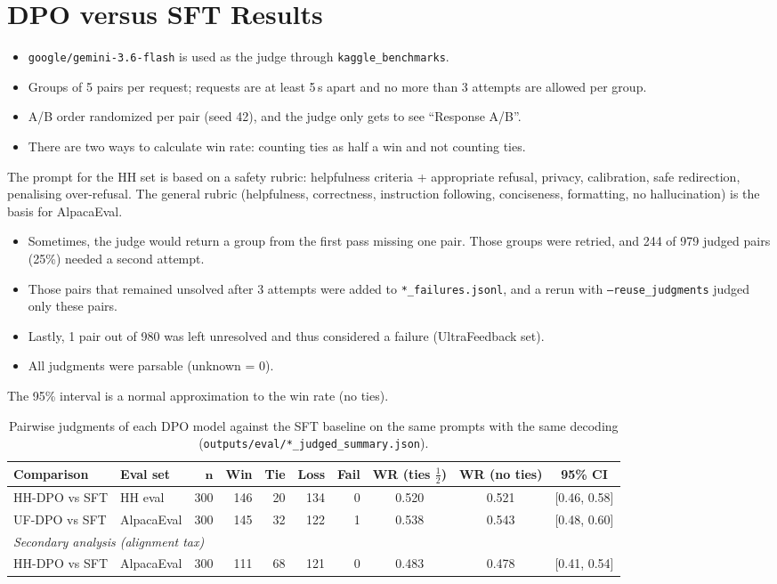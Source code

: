 \documentclass[10pt]{article}
\begin{document}
\section{DPO versus SFT Results}\label{sec:results}

\begin{itemize}
\item \texttt{google/gemini-3.6-flash} is used as the judge through \texttt{kaggle\_benchmarks}.
\item Groups of 5 pairs per request; requests are at least 5\,s apart and no more than 3 attempts are allowed per group.
\item A/B order randomized per pair (seed 42), and the judge only gets to see ``Response A/B''.
\item There are two ways to calculate win rate: counting ties as half a win and not counting ties.
\end{itemize}
The prompt for the HH set is based on a safety rubric: helpfulness criteria + appropriate refusal, privacy, calibration, safe redirection, penalising over-refusal. The general rubric (helpfulness, correctness, instruction following, conciseness, formatting, no hallucination) is the basis for AlpacaEval.
\begin{itemize}
\item Sometimes, the judge would return a group from the first pass missing one pair. Those groups were retried, and 244 of 979 judged pairs (25\%) needed a second attempt.
\item Those pairs that remained unsolved after 3 attempts were added to \texttt{*\_failures.jsonl}, and a rerun with \texttt{--reuse\_judgments} judged only these pairs.
\item Lastly, 1 pair out of 980 was left unresolved and thus considered a failure (UltraFeedback set).
\item All judgments were parsable (unknown = 0).
\end{itemize}
The 95\% interval is a normal approximation to the win rate (no ties).

\begin{table}[H]
\centering\small
\caption{Pairwise judgments of each DPO model against the SFT baseline on the same prompts with the same decoding (\texttt{outputs/eval/*\_judged\_summary.json}).}
\label{tab:results}
\setlength{\tabcolsep}{4pt}
\begin{tabular}{llrrrrrccc}
\toprule
\textbf{Comparison} & \textbf{Eval set} & $\boldsymbol{n}$ & \textbf{Win} & \textbf{Tie} & \textbf{Loss} & \textbf{Fail} & \textbf{WR (ties $\tfrac{1}{2}$)} & \textbf{WR (no ties)} & \textbf{95\% CI} \\
\midrule
HH-DPO vs SFT & HH eval & 300 & 146 & 20 & 134 & 0 & 0.520 & 0.521 & [0.46, 0.58] \\
UF-DPO vs SFT & AlpacaEval & 300 & 145 & 32 & 122 & 1 & 0.538 & 0.543 & [0.48, 0.60] \\
\midrule
\multicolumn{10}{l}{\emph{Secondary analysis (alignment tax)}} \\
HH-DPO vs SFT & AlpacaEval & 300 & 111 & 68 & 121 & 0 & 0.483 & 0.478 & [0.41, 0.54] \\
\bottomrule
\end{tabular}
\end{table}
\end{document}
